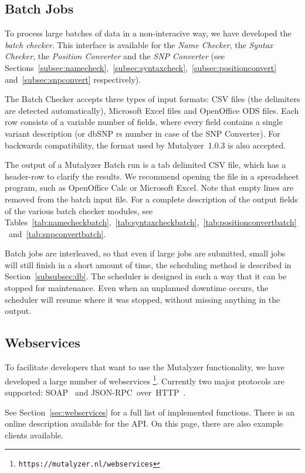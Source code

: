 \documentclass{article}
\begin{document}
\subsection{Batch Jobs} \label{subsec:batch}
To process large batches of data in a non-interacive way, we have developed the
\emph{batch checker}. This interface is available for the \emph{Name Checker},
the \emph{Syntax Checker}, the \emph{Position Converter} and the
\emph{SNP Converter} (see
Sections~\ref{subsec:namecheck},~\ref{subsec:syntaxcheck},~\ref{subsec:positionconvert} and~\ref{subsec:snpconvert} respectively).

The Batch Checker accepts three types of input formats: CSV files (the
delimiters are detected automatically), Microsoft Excel files and OpenOffice
ODS files. Each row consists of a variable number of fields, where every field
contains a single variant description (or dbSNP rs number in case of the SNP
Converter). For backwards compatibility, the format used by Mutalyzer~1.0.3 is
also accepted.

The output of a Mutalyzer Batch run is a tab delimited CSV file, which has a
header-row to clarify the results. We recommend opening the file in a
spreadsheet program, such as OpenOffice Calc or Microsoft Excel. Note that
empty lines are removed from the batch input file. For a complete description
of the output fields of the various batch checker modules, see
Tables~\ref{tab:namecheckbatch},~\ref{tab:syntaxcheckbatch},~\ref{tab:positionconvertbatch}~and~\ref{tab:snpconvertbatch}.

Batch jobs are interleaved, so that even if large jobs are submitted, small
jobs will still finish in a short amount of time, the scheduling method is
described in Section~\ref{subsubsec:db}. The scheduler is designed in such a
way that it can be stopped for maintenance. Even when an unplanned downtime
occurs, the scheduler will resume where it was stopped, without missing
anything in the output.

\subsection{Webservices}
To facilitate developers that want to use the Mutalyzer functionality, we have
developed a large number of webservices
\footnote{\texttt{https://mutalyzer.nl/webservices}}. Currently two major
protocols are supported: SOAP~\cite{SOAP} and
JSON-RPC~over~HTTP~\cite{JSON-RPC}. 

See Section~\ref{sec:webservices} for a full list of implemented functions.
There is an online description available for the API. On this page, there are
also example clients available.
\end{document}
